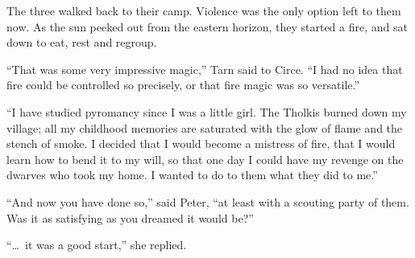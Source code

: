 The three walked back to their camp.  Violence was the only option left to them now.  As the sun peeked out from the eastern horizon, they started a fire, and sat down to eat, rest and regroup.

``That was some very impressive magic,'' Tarn said to Circe.  ``I had no idea that fire could be controlled so precisely, or that fire magic was so versatile.''

``I have studied pyromancy since I was a little girl.  The Tholkis burned down my village; all my childhood memories are saturated with the glow of flame and the stench of smoke.  I decided that I would become a mistress of fire, that I would learn how to bend it to my will, so that one day I could have my revenge on the dwarves who took my home.  I wanted to do to them what they did to me.''

``And now you have done so,'' said Peter, ``at least with a scouting party of them.  Was it as satisfying as you dreamed it would be?''

``\ldots\ it was a good start,'' she replied.



